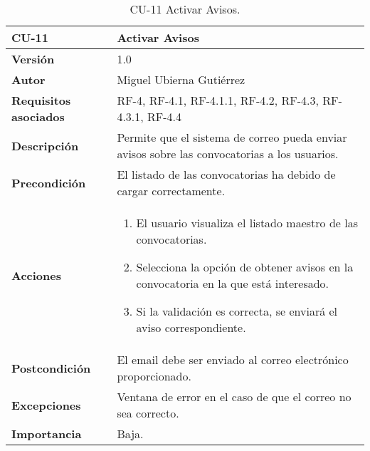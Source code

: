 \begin{table}[p]
	\centering
	\begin{tabularx}{\linewidth}{ p{} p{} }
		\toprule
		\textbf{CU-11}    & \textbf{Activar Avisos}\\
		\toprule
		\textbf{Versión}              & 1.0    \\
		\textbf{Autor}                & Miguel Ubierna Gutiérrez \\
		\textbf{Requisitos asociados} & RF-4, RF-4.1, RF-4.1.1, RF-4.2, RF-4.3, RF-4.3.1, RF-4.4  \\
		\textbf{Descripción}          & Permite que el sistema de correo pueda enviar avisos sobre las convocatorias a los usuarios.  \\
		\textbf{Precondición}         & El listado de las convocatorias ha debido de cargar correctamente.\\
		\textbf{Acciones}             &
		\begin{enumerate}
			\def\labelenumi{\arabic{enumi}.}
			\tightlist
			\item El usuario visualiza el listado maestro de las convocatorias.
                \item Selecciona la opción de obtener avisos en la convocatoria en la que está interesado.
                \item Si la validación es correcta, se enviará el aviso correspondiente.
		\end{enumerate}\\
		\textbf{Postcondición}        & El email debe ser enviado al correo electrónico proporcionado. \\
		\textbf{Excepciones}          & Ventana de error en el caso de que el correo no sea correcto.  \\
		\textbf{Importancia}          & Baja.  \\
		\bottomrule
	\end{tabularx}
	\caption{CU-11 Activar Avisos.}
\end{table}



